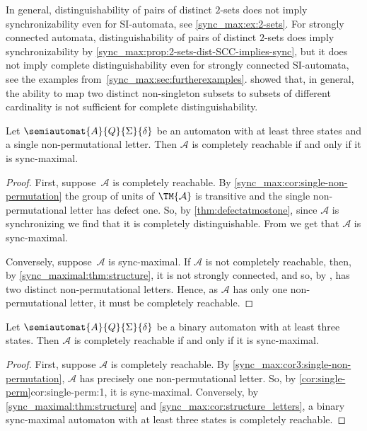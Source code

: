 In general, distinguishability of pairs of distinct $2$-sets does not imply
synchronizability even for SI-automata, see \cref{sync_max:ex:2-sets}. For strongly connected 
automata, distinguishability of pairs of distinct $2$-sets does imply
synchronizability by \cref{sync_max:prop:2-sets-dist-SCC-implies-sync},
but it does not imply complete distinguishability even for strongly connected SI-automata,
see the examples from~\cref{sync_max:sec:furtherexamples}.
 showed that, in general, the
ability to map two distinct non-singleton subsets to subsets of different cardinality
is not sufficient for complete distinguishability.

\begin{corollary} \label{cor:single-perm}
	Let $\semiautomat{A}{Q}{\Sigma}{\delta}$
	be an automaton 
	with at least three states and a single non-permutational letter.
	Then $\mathcal A$ is completely reachable
	if and only if it is sync-maximal.		
\end{corollary}
\begin{proof}
	First, suppose~$\mathcal A$ is completely reachable.
	By \cref{sync_max:cor:single-non-permutation}
	the group of units of $\TM{\mathcal A}$	is transitive
	and the single non-permutational letter has defect one.
	So, by \cref{thm:defectatmostone}, since $\mathcal A$ is synchronizing
	we find that it is completely distinguishable.
	From 
	we get that $\mathcal A$ is sync-maximal.
		
	Conversely, suppose~$\mathcal A$ is sync-maximal.
	If $\mathcal A$ is not completely reachable,
	then, by \cref{sync_maximal:thm:structure}, it is not strongly connected,
	and so, by ,
	has two distinct non-permutational letters.
	Hence, as $\mathcal A$ has only one non-permutational letter, it must be completely reachable.		
\end{proof}

\begin{corollary} \label{cor:char-bin-compl-reach}
	Let $\semiautomat{A}{Q}{\Sigma}{\delta}$
	be a binary automaton 
	with at least three states.
	Then $\mathcal A$ is completely reachable
	if and only if it is sync-maximal.		
\end{corollary}
\begin{proof}
	First, suppose $\mathcal A$ is completely reachable. By \cref{sync_max:cor3:single-non-permutation}, $\mathcal A$
	has precisely one non-permutational letter.
	So, by \cref{cor:single-perm}{cor:single-perm:1}, it is sync-maximal.
	Conversely, by \cref{sync_maximal:thm:structure} and \cref{sync_max:cor:structure_letters}, 
	a binary sync-maximal
	automaton with at least three states
	is completely reachable.	
\end{proof}

